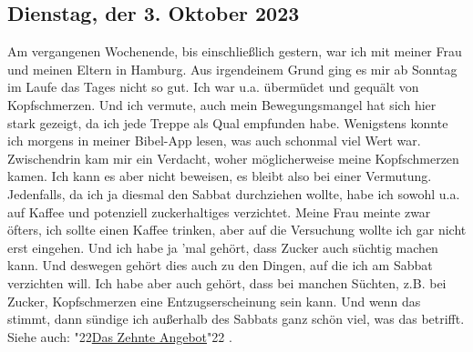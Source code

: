 \documentclass[12pt,a4paper]{article}
\newcommand{\q}[1]{\char"22{#1}\char"22 }
\begin{document}
	\subsection{Dienstag, der 3. Oktober 2023}
		Am vergangenen Wochenende,
		bis einschlie{\ss}lich gestern,
		war ich mit meiner Frau und meinen Eltern in Hamburg.
		Aus irgendeinem Grund ging es mir ab Sonntag im Laufe das Tages nicht so gut.
		Ich war u.a. \"uberm\"udet und gequ\"alt von Kopfschmerzen.
		Und ich vermute,
		auch mein Bewegungsmangel hat sich hier stark gezeigt,
		da ich jede Treppe als Qual empfunden habe.
		Wenigstens konnte ich morgens in meiner Bibel-App lesen,
		was auch schonmal viel Wert war.
		Zwischendrin kam mir ein Verdacht,
		woher m\"oglicherweise meine Kopfschmerzen kamen.
		Ich kann es aber nicht beweisen,
		es bleibt also bei einer Vermutung.
		Jedenfalls,
		da ich ja diesmal den Sabbat durchziehen wollte,
		habe ich sowohl u.a. auf Kaffee und potenziell zuckerhaltiges verzichtet.
		Meine Frau meinte zwar \"ofters,
		ich sollte einen Kaffee trinken,
		aber auf die Versuchung wollte ich gar nicht erst eingehen.
		Und ich habe ja 'mal geh\"ort,
		dass Zucker auch s\"uchtig machen kann.
		Und deswegen geh\"ort dies auch zu den Dingen,
		auf die ich am Sabbat verzichten will.
		Ich habe aber auch geh\"ort,
		dass bei manchen S\"uchten,
		z.B. bei Zucker,
		Kopfschmerzen eine Entzugserscheinung sein kann.
		Und wenn das stimmt,
		dann s\"undige ich au{\ss}erhalb des Sabbats ganz sch\"on viel,
		was das betrifft.
		Siehe auch: \q{\hyperref[DasZehnteAngebot]{Das Zehnte Angebot}}.
		
\end{document}
